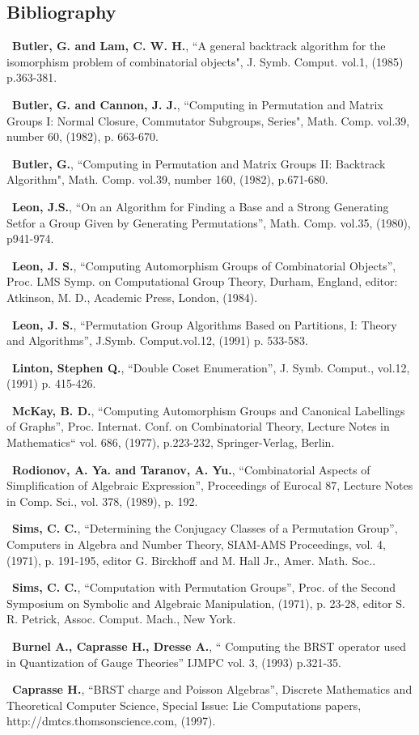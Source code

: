 \subsection{Bibliography}
\begin{list}{-}{\parsep 0in \itemsep 1pt}     
\item\  {\bf Butler, G. and Lam, C. W. H.},
   ``A general backtrack algorithm for the isomorphism problem of
     combinatorial objects",
 J. Symb. Comput. vol.1, (1985) p.363-381.
\item\ {\bf Butler, G. and Cannon, J. J.},
    ``Computing in Permutation and Matrix Groups {I}: Normal Closure,
        Commutator Subgroups, Series",
 Math. Comp. vol.39, number 60, (1982), p. 663-670.
\item\ {\bf Butler, G.},
     ``Computing in Permutation and Matrix Groups {II}:
       Backtrack Algorithm",  Math. Comp. vol.39, number 160,
      (1982), p.671-680.
\item\  {\bf Leon, J.S.},
 ``On an Algorithm for Finding a Base and a Strong 
Generating Setfor a Group Given by Generating Permutations'',
Math. Comp. vol.35, (1980), p941-974.
\item\  {\bf Leon, J. S.},
 ``Computing Automorphism Groups of Combinatorial Objects'',
 Proc. {LMS} Symp. on Computational Group Theory, Durham,
                  England, editor: Atkinson, M. D.,
 Academic Press, London, (1984). 
\item\  {\bf Leon, J. S.},
``Permutation Group Algorithms Based on Partitions, {I}: Theory and
          Algorithms'', J.Symb. Comput.vol.12, (1991) p. 533-583.
\item\  {\bf Linton, Stephen Q.}, ``Double Coset Enumeration'',
        J. Symb. Comput., vol.12, (1991) p. 415-426.
\item\ {\bf McKay, B. D.},
``Computing Automorphism Groups and Canonical Labellings of Graphs'',
Proc. Internat. Conf. on Combinatorial Theory,
Lecture Notes in Mathematics`` vol. 686, (1977), p.223-232,
Springer-Verlag, Berlin.
\item\ {\bf Rodionov, A. Ya. and Taranov, A. Yu.},
``Combinatorial Aspects of Simplification of
Algebraic Expression'', Proceedings of Eurocal 87,
Lecture Notes in Comp. Sci., vol. 378,  (1989), p. 192.
\item\ {\bf Sims, C. C.},
``Determining the Conjugacy Classes of a Permutation Group'',
Computers in Algebra and Number Theory,
SIAM-AMS Proceedings, vol. 4, (1971), p. 191-195,
editor G. Birckhoff and M. {Hall Jr.}, Amer. Math. Soc..
\item\ {\bf Sims, C. C.},
``Computation with Permutation Groups'',
Proc. of the Second Symposium on Symbolic and Algebraic
                          Manipulation, (1971), p. 23-28,
editor S. R. Petrick, Assoc. Comput. Mach., New York.
\item\ {\bf   Burnel A., Caprasse H., Dresse A.},
`` Computing the BRST operator used in Quantization of Gauge Theories''
IJMPC vol. 3, (1993) p.321-35.
\item\ {\bf Caprasse H.},
``BRST charge and Poisson Algebras'',
Discrete Mathematics and Theoretical Computer Science,
Special Issue: Lie Computations papers, http://dmtcs.thomsonscience.com,
(1997).
\end{list}
\fi